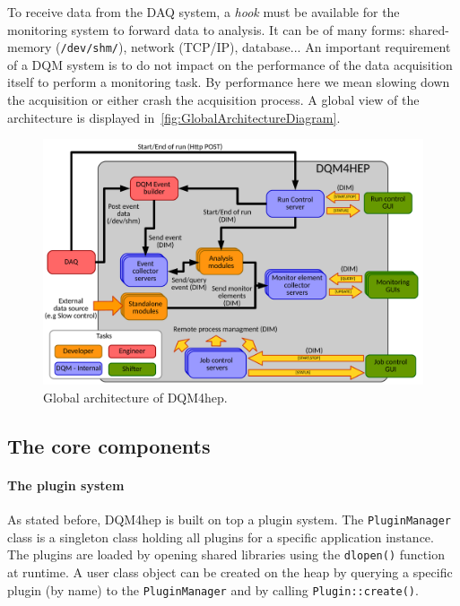 \documentclass{webofc}
\begin{document}
To receive data from the DAQ system, a \textit{hook} must be available for the monitoring system to forward data to analysis. It can be of many forms: shared-memory (\texttt{/dev/shm/}), network (TCP/IP), database... An important requirement of a DQM system is to do not impact on the performance of the data acquisition itself to perform a monitoring task. By performance here we mean slowing down the acquisition or either crash the acquisition process.
A global view of the architecture is displayed in~\autoref{fig:GlobalArchitectureDiagram}.

\begin{figure}
  \centering
  \includegraphics[width=.95\textwidth]{figs/GlobalArchitectureDiagram.pdf}
  \caption{Global architecture of DQM4hep.}
  \label{fig:GlobalArchitectureDiagram}
\end{figure}

\subsection{The core components}
\label{subsec:core}

\paragraph{The plugin system}

As stated before, DQM4hep is built on top a plugin system. The \texttt{PluginManager} class is a singleton class holding all plugins for a specific application instance. The plugins are loaded by opening shared libraries using the \texttt{dlopen()} function at runtime. A user class object can be created on the heap by querying a specific plugin (by name) to the \texttt{PluginManager} and by calling \texttt{Plugin::create()}.
\end{document}
